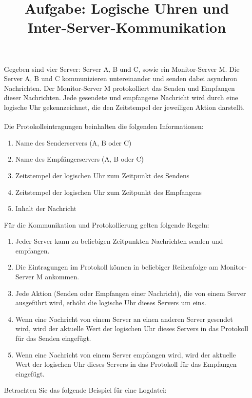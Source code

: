 \documentclass{article}
\begin{document}
\title{Aufgabe: Logische Uhren und Inter-Server-Kommunikation}
\maketitle

Gegeben sind vier Server: Server A, B und C, sowie ein Monitor-Server M. Die Server A, B und C kommunizieren untereinander und senden dabei asynchron Nachrichten. Der Monitor-Server M protokolliert das Senden und Empfangen dieser Nachrichten. Jede gesendete und empfangene Nachricht wird durch eine logische Uhr gekennzeichnet, die den Zeitstempel der jeweiligen Aktion darstellt.
\\\\
Die Protokolleintragungen beinhalten die folgenden Informationen:
\begin{enumerate}
  \item Name des Senderservers (A, B oder C)
  \item Name des Empfängerservers (A, B oder C)
  \item Zeitstempel der logischen Uhr zum Zeitpunkt des Sendens
  \item Zeitstempel der logischen Uhr zum Zeitpunkt des Empfangens
  \item Inhalt der Nachricht
\end{enumerate}
Für die Kommunikation und Protokollierung gelten folgende Regeln:
\begin{enumerate}
  \item Jeder Server kann zu beliebigen Zeitpunkten Nachrichten senden und empfangen.
  \item Die Eintragungen im Protokoll können in beliebiger Reihenfolge am Monitor-Server M ankommen.
  \item Jede Aktion (Senden oder Empfangen einer Nachricht), die von einem Server ausgeführt wird, erhöht die logische Uhr dieses Servers um eins.
  \item Wenn eine Nachricht von einem Server an einen anderen Server gesendet wird, wird der aktuelle Wert der logischen Uhr dieses Servers in das Protokoll für das Senden eingefügt.
  \item Wenn eine Nachricht von einem Server empfangen wird, wird der aktuelle Wert der logischen Uhr dieses Servers in das Protokoll für das Empfangen eingefügt.
\end{enumerate}
Betrachten Sie das folgende Beispiel für eine Logdatei:
\end{document}
